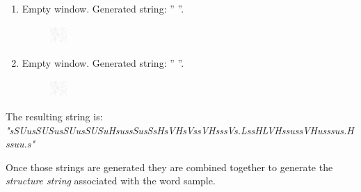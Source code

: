 \begin{enumerate}[label=(\alph*)]
\begin{figure}[H]
\end{figure} 
\item Empty window. Generated string: ''\emph{ }''.
\begin{figure}[H]
\centering
\includegraphics[width=0.06\textwidth]{images/missouri/11.png}
\end{figure} 
\item Empty window. Generated string: ''\emph{ }''.
\begin{figure}[H]
\centering
\includegraphics[width=0.06\textwidth]{images/missouri/12.png}
\end{figure} 
\end{enumerate}
The resulting string is: \newline \emph{"sSUusSUSusSUusSUSuHsussSusSsHsVHsVssVHsssVs.LssHLVHssussVHusssus.Hssuu.s"}

\vspace{3mm}

Once those strings are generated they are combined together to generate the \textit{structure string} associated with the word sample. 

